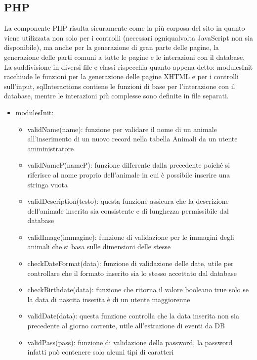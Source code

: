     \subsection{PHP}
        La componente PHP risulta sicuramente come la più corposa del sito in quanto viene utilizzata non solo per i controlli (necessari ogniqualvolta JavaScript non sia disponibile), ma anche per la generazione di gran parte delle pagine, la generazione delle parti comuni a tutte le pagine e le interazioni con il database. La suddivisione in diversi file e classi rispecchia quanto appena detto: modulesInit racchiude le funzioni per la generazione delle pagine XHTML e per i controlli sull'input, sqlInteractions contiene le funzioni di base per l'interazione con il database, mentre le interazioni più complesse sono definite in file separati.
        \begin{itemize}
            \item modulesInit:
                \begin{itemize}
                    \item validName(name): funzione per validare il nome di un animale all'inserimento di un nuovo record nella tabella Animali da un utente amministratore
                    \item validNameP(nameP): funzione differente dalla precedente poiché si riferisce al nome proprio dell'animale in cui è possibile inserire una stringa vuota
                    \item validDescription(testo): questa funzione assicura che la descrizione dell'animale inserita sia consistente e di lunghezza permissibile dal database
                    \item validImage(immagine): funzione di validazione per le immagini degli animali che si basa sulle dimensioni delle stesse
                    \item checkDateFormat(data): funzione di validazione delle date, utile per controllare che il formato inserito sia lo stesso accettato dal database
                    \item checkBirthdate(data): funzione che ritorna il valore booleano true solo se la data di nascita inserita è di un utente maggiorenne
                    \item validDate(data): questa funzione controlla che la data inserita non sia precedente al giorno corrente, utile all'estrazione di eventi da DB
                    \item validPass(pass): funzione di validazione della password, la password infatti può contenere solo alcuni tipi di caratteri

\end{itemize}
\end{itemize}
